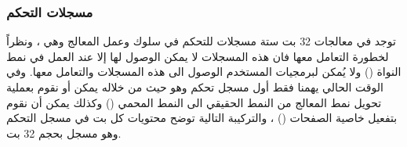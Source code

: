 \documentclass[document.tex]{subfiles}
\begin{document}
\subsubsection{مسجلات التحكم }
توجد في معالجات 32 بت ستة مسجلات للتحكم في سلوك وعمل المعالج وهي  ، ونظراً لخطورة التعامل معها فان هذه المسجلات لا يمكن الوصول لها إلا عند العمل في نمط النواة () ولا يُمكن لبرمجيات المستخدم الوصول الى هذه المسجلات والتعامل معها. وفي الوقت الحالي يهمنا فقط أول مسجل تحكم وهو  حيث من خلاله يمكن أو نقوم بعملية تحويل نمط المعالج من النمط الحقيقي الى النمط المحمي () وكذلك يمكن أن نقوم بتفعيل خاصية الصفحات () ، والتركيبة التالية توضح محتويات كل بت في مسجل التحكم  وهو مسجل بحجم 32 بت.

\begin{english}


\end{english}
\end{document}
